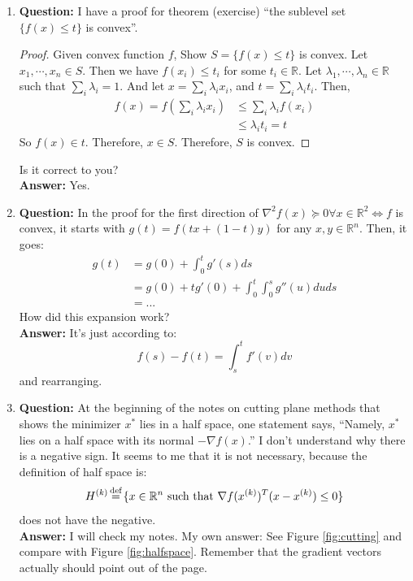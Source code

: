 \documentclass[12pt]{article}
\newcommand\defeq{\stackrel{\mathclap{\normalfont\mbox{\scriptsize def}}}{=}}
\begin{document}
\begin{enumerate}
\item \textbf{Question:} I have a proof for theorem (exercise) ``the sublevel set $\{f(x)\leq t\}$ is convex''.
  \begin{proof}
    Given convex function $f$, Show $S=\{f(x)\leq t\}$ is convex. Let $x_1,\cdots,x_n\in S$. Then we have $f(x_i)\leq t_i$ for some $t_i\in\mathbb{R}$. Let $\lambda_1,\cdots,\lambda_n\in\mathbb{R}$ such that $\sum_{i}\lambda_i=1$. And let $x=\sum_{i}\lambda_ix_i$, and $t=\sum_{i}\lambda_it_i$. Then,
    \begin{align}
      f(x)=f(\sum_i\lambda_{i}x_i)&\leq\sum_i\lambda_if(x_i)\\
      &\leq \lambda_it_i = t
    \end{align}
    So $f(x)\in t$. Therefore, $x\in S$. Therefore, $S$ is convex.
  \end{proof}
  Is it correct to you?\\
  \textbf{Answer:} Yes.

\item \textbf{Question:} In the proof for the first direction of $\nabla^2f(x)\succeq 0\forall x\in\mathbb{R}^2\Leftrightarrow f$ is convex, it starts with $g(t)=f(tx+(1-t)y)$ for any $x,y\in\mathbb{R}^n$. Then, it goes:
  \begin{align}
    g(t) &= g(0) + \int_{0}^tg'(s)ds\\
    &= g(0) + tg'(0) + \int_{0}^t\int_0^sg''(u)duds\\
    &= ...
  \end{align}
  How did this expansion work?\\
  \textbf{Answer:} It's just according to:
  \begin{equation}
    f(s)-f(t)=\int_{s}^tf'(v)dv
  \end{equation}
  and rearranging.

\item \textbf{Question:} At the beginning of the notes on cutting plane methods that shows the minimizer $x^*$ lies in a half space, one statement says, ``Namely, $x^*$ lies on a half space with its normal $-\nabla f(x)$.'' I don't understand why there is a negative sign. It seems to me that it is not necessary, because the definition of half space is:
  \begin{equation}
    H^{(k)}\defeq\{x\in\mathbb{R}^n \text{ such that } \nabla f(x^{(k)})^T(x-x^{(k)})\leq 0\}
  \end{equation}
  does not have the negative. \\
  \textbf{Answer:} I will check my notes. My own answer: See Figure \ref{fig:cutting} and compare with Figure \ref{fig:halfspace}. Remember that the gradient vectors actually should point out of the page.


\end{enumerate}
\end{document}
